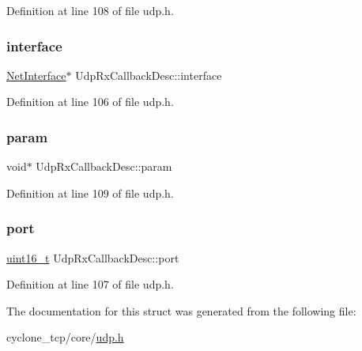 Definition at line 108 of file udp.\+h.

\mbox{\label{structUdpRxCallbackDesc_a686b2abba991578f9841a3cd6e75ca10}} 
\subsubsection{\texorpdfstring{interface}{interface}}
{\footnotesize\ttfamily \hyperlink{net_8h_a2234db8911a1148c9159979d8f5e0d6b}{Net\+Interface}$\ast$ Udp\+Rx\+Callback\+Desc\+::interface}



Definition at line 106 of file udp.\+h.

\mbox{\label{structUdpRxCallbackDesc_ab7ba8c4493339f103e1621aa28cbcf7d}} 
\subsubsection{\texorpdfstring{param}{param}}
{\footnotesize\ttfamily void$\ast$ Udp\+Rx\+Callback\+Desc\+::param}



Definition at line 109 of file udp.\+h.

\mbox{\label{structUdpRxCallbackDesc_a4c9f42715adbf7832647d1950846e61d}} 
\subsubsection{\texorpdfstring{port}{port}}
{\footnotesize\ttfamily \hyperlink{stdint_8h_a273cf69d639a59973b6019625df33e30}{uint16\+\_\+t} Udp\+Rx\+Callback\+Desc\+::port}



Definition at line 107 of file udp.\+h.



The documentation for this struct was generated from the following file\+:\begin{DoxyCompactItemize}
\item 
cyclone\+\_\+tcp/core/\hyperlink{udp_8h}{udp.\+h}\end{DoxyCompactItemize}
